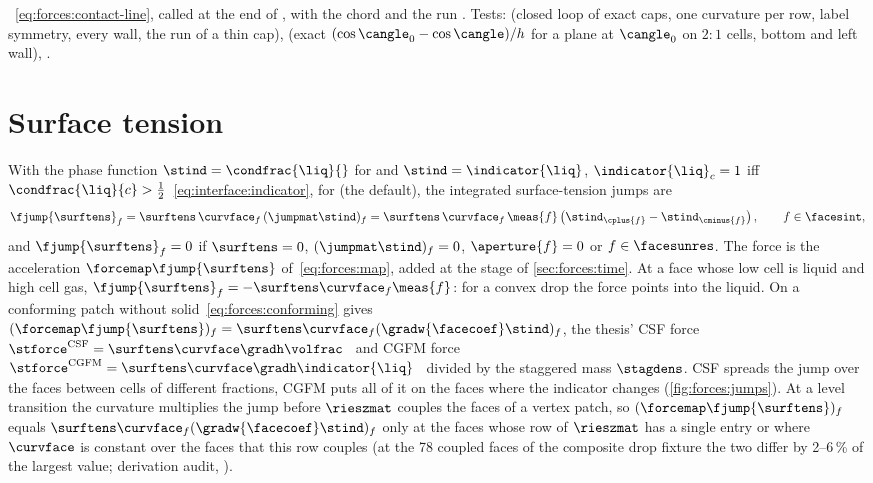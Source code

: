 \begin{implnote}
~\cref{eq:forces:contact-line},
called at the end of ,
with the chord 
and the run .
Tests: 
(closed loop of exact caps, one curvature per row, label symmetry, every
wall, the run of a thin cap),
(exact $(\cos\cangle_0-\cos\cangle)/h$ for a plane at $\cangle_0$ on $2{:}1$
cells, bottom and left wall),
.
\end{implnote}

\section{Surface tension}\label{sec:forces:surface-tension}
With the phase function $\stind=\condfrac{\liq}{}$ for  and
$\stind=\indicator{\liq}$, $\indicator{\liq}_c=1$ iff
$\condfrac{\liq}{c}>\half$~\cref{eq:interface:indicator}, for 
(the default), the integrated surface-tension jumps are
\begin{equation}\label{eq:forces:st-jump}
  \fjump{\surftens}_f=\surftens\,\curvface_f\,(\jumpmat\stind)_f
  =\surftens\,\curvface_f\,\meas{f}\roundpar{\stind_{\cplus{f}}-\stind_{\cminus{f}}},
  \qquad f\in\facesint,
\end{equation}
and $\fjump{\surftens}_f=0$ if $\surftens=0$, $(\jumpmat\stind)_f=0$,
$\aperture{f}=0$ or $f\in\facesunres$. The force is the acceleration
$\forcemap\fjump{\surftens}$ of~\cref{eq:forces:map}, added at the stage of
\cref{sec:forces:time}. At a face whose low cell is liquid and high cell gas,
$\fjump{\surftens}_f=-\surftens\curvface_f\meas{f}$: for a convex drop the
force points into the liquid. On a conforming patch
without solid~\cref{eq:forces:conforming} gives
$(\forcemap\fjump{\surftens})_f=\surftens\curvface_f(\gradw{\facecoef}\stind)_f$,
the thesis' CSF force $\stforce^{\mathrm{CSF}}=\surftens\curvface\gradh\volfrac$~
and CGFM force $\stforce^{\mathrm{CGFM}}=\surftens\curvface\gradh\indicator{\liq}$~
divided by the staggered mass $\stagdens$. CSF spreads the jump over the faces
between cells of different fractions, CGFM puts all of it on the faces where
the indicator changes (\cref{fig:forces:jumps}). At a level transition the
curvature multiplies the jump before $\rieszmat$ couples the faces of a
vertex patch, so $(\forcemap\fjump{\surftens})_f$ equals
$\surftens\curvface_f(\gradw{\facecoef}\stind)_f$ only at the faces whose
row of $\rieszmat$ has a single entry or where $\curvface$ is constant over
the faces that this row couples (at the 78 coupled faces of the composite
drop fixture the two differ by 2--6\,\% of the largest value; derivation
audit, ).

